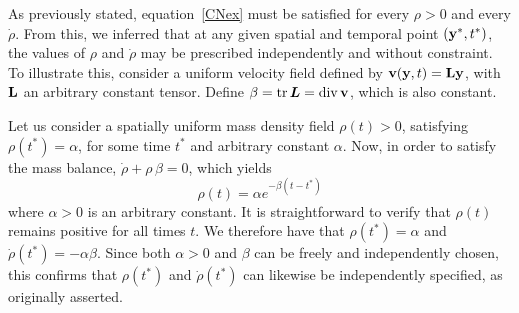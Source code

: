 \begin{remark}
As previously stated, equation~\eqref{CNex} must be satisfied for every $\rho > 0$ and every $\dot{\rho}$. From this, we inferred that  
at any given spatial and temporal point $(\mathbf{y}^\ast, t^\ast)$, the values of $\rho$ and $\dot{\rho}$ may be prescribed  
independently and without constraint. To illustrate this, consider a uniform velocity field defined by $\mathbf{v}(\mathbf{y}, t) = \mathbf{L} \mathbf{y}$,  
with $\mathbf{L}$ an arbitrary constant tensor. Define $\beta = \operatorname{tr} \bm{L} = \operatorname{div} \mathbf{v}$, which is also constant.  

Let us consider a spatially uniform mass density field $\rho(t)>0$, satisfying  $\rho(t^\ast)=\alpha$, for some time $t^\ast$ and arbitrary constant $\alpha$. Now, in order to satisfy the mass balance,  $\dot{\rho} + \rho \,\beta = 0$, which yields
\[
\rho(t) = \alpha e^{-\beta(t - t^\ast)}
\]  
where $\alpha > 0$ is an arbitrary constant. It is straightforward to verify that $\rho(t)$ remains positive for all times $t$.  
We therefore have that  $\rho(t^\ast) = \alpha$ and $\dot{\rho}(t^\ast) = -\alpha \beta$.  
Since both $\alpha > 0$ and $\beta$ can be freely and independently chosen,  
this confirms that $\rho(t^\ast)$ and $\dot{\rho}(t^\ast)$ can likewise be independently specified,  
as originally asserted.


\end{remark}


